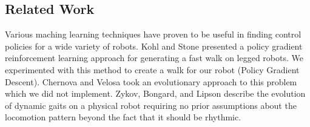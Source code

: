 \subsection{Related Work}







Various maching learning techniques have proven to be useful in
finding control policies for a wide variety of robots. Kohl and
Stone\cite{kohl} presented a policy gradient reinforcement learning
approach for generating a fast walk on legged robots. We experimented
with this method to create a walk for our robot (Policy Gradient
Descent). Chernova and Velosa\cite{chernova} took an evolutionary
approach to this problem which we did not implement.  Zykov, Bongard,
and Lipson\cite{zykov} describe the evolution of dynamic gaits on a
physical robot requiring no prior assumptions about the locomotion
pattern beyond the fact that it should be rhythmic.


